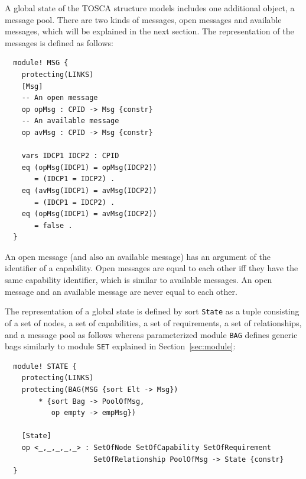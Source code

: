 \documentclass[12pt]{report}
\begin{document}
A global state of the TOSCA structure models includes one additional
object, a message pool. There are two kinds of messages, open messages
and available messages, which will be explained in the next
section. The representation of the messages is defined as follows:
\small
\begin{verbatim}
  module! MSG {
    protecting(LINKS)
    [Msg]
    -- An open message
    op opMsg : CPID -> Msg {constr}
    -- An available message
    op avMsg : CPID -> Msg {constr}
  
    vars IDCP1 IDCP2 : CPID 
    eq (opMsg(IDCP1) = opMsg(IDCP2))
       = (IDCP1 = IDCP2) .
    eq (avMsg(IDCP1) = avMsg(IDCP2))
       = (IDCP1 = IDCP2) .
    eq (opMsg(IDCP1) = avMsg(IDCP2))
       = false .
  }    
\end{verbatim}
\normalsize
An open message (and also an available message) has an argument of the
identifier of a capability. Open messages are equal to each other iff
they have the same capability identifier, which is similar to
available messages. An open message and an available message are never
equal to each other.

The representation of a global state is defined by sort {\tt State} as
a tuple consisting of a set of nodes, a set of capabilities, a set of
requirements, a set of relationships, and a message pool as follows
whereas parameterized module {\tt BAG} defines generic bags similarly
to module {\tt SET} explained in Section~\ref{sec:module}:
\small
\begin{verbatim}
  module! STATE {
    protecting(LINKS)
    protecting(BAG(MSG {sort Elt -> Msg})
        * {sort Bag -> PoolOfMsg,
           op empty -> empMsg})
  
    [State]
    op <_,_,_,_,_> : SetOfNode SetOfCapability SetOfRequirement 
                     SetOfRelationship PoolOfMsg -> State {constr}
  }
\end{verbatim}
\normalsize
\end{document}
